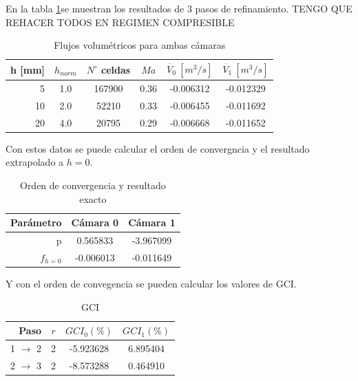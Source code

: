 \documentclass[11pt]{article}
\begin{document}
En la tabla \ref{tab:res_caso0}se muestran los resultados de 3 pasos de
refinamiento. TENGO QUE REHACER TODOS EN REGIMEN COMPRESIBLE

\begin{table}
    \centering
    \begin{tabular}{rccccc}\toprule
        h [mm] & $h_{norm}$ & $N^{\circ}$ celdas & $Ma$ & $\dot{V_{0}}\ [m^3/s] $ & $\dot{V_{1}}\ [m^3/s]$ \\ \midrule
        5      & 1.0        & 167900             & 0.36 & -0.006312     & -0.012329 \\
        10     & 2.0        & 52210              & 0.33 & -0.006455     & -0.011692 \\
        20     & 4.0        & 20795              & 0.29 & -0.006668     & -0.011652 \\ \bottomrule
    \end{tabular}
    \caption{Flujos volumétricos para ambas cámaras}
    \label{tab:res_caso0}
\end{table}

Con estos datos se puede calcular el orden de convergncia y el resultado
extrapolado a $h=0$.

\begin{table}
    \centering
    \begin{tabular}{rcc}\toprule
        Parámetro & Cámara 0  & Cámara 1  \\ \midrule
        p         &  0.565833 & -3.967099 \\
        $f_{h=0}$ & -0.006013 & -0.011649 \\ \bottomrule
    \end{tabular}
    \caption{Orden de convergencia y resultado exacto}
    \label{tab:res1_caso0}
\end{table}

Y con el orden de convegencia se pueden calcular los valores de GCI.

\begin{table}
    \centering
    \begin{tabular}{rccc}\toprule
        Paso              & $r$ & $GCI_0(\%)$ & $GCI_1(\%)$ \\ \midrule
        1 $\rightarrow$ 2 & 2   & -5.923628   & 6.895404 \\
        2 $\rightarrow$ 3 & 2   & -8.573288   & 0.464910 \\ \bottomrule
    \end{tabular}
    \caption{GCI}
    \label{tab:gci_caso_0}
\end{table}
\end{document}

